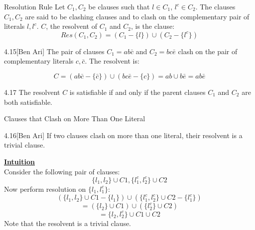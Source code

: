 \documentclass[style=sailor,size=12pt]{powerdot}
\begin{document}
\begin{wideslide}[bm=,toc=]{Resolution Rule}
Let $C_1, C_2$ be clauses such that $l \in C_1$, $l^c \in C_2$. The clauses
$C_1,C_2$ are said to be clashing clauses and to clash on the complementary
pair of literals $l,l^c$. $C$, the resolvent of $C_1$ and $C_2$, is the
clause:\\
\[ 
  Res(C_1,C_2) = (C_1 - \{l\}) \cup (C_2 - \{l^c\})
\]
\begin{ex}{4.15}[Ben Ari]
The pair of clauses $C_1 = ab\bar{c}$ and $C_2 = bc\bar{e}$ clash on the pair
of complementary literals $c, \bar{c}$. The resolvent is:

\[ 
  C = (ab\bar{c} - \{\bar{c}\}) \cup (bc\bar{e} - \{c\}) = ab\cup b\bar{e} = ab\bar{e}
  \]

\end{ex}
\begin{thm}{4.17}
The resolvent $C$ is satisfiable if and only if the parent clauses $C_1$ and
$C_2$ are both satisfiable.
\end{thm}

\end{wideslide}

\begin{wideslide}[bm=,toc=]{Clauses that Clash on More Than One Literal}
\begin{lem}{4.16}[Ben Ari]
If two clauses clash on more than one literal, their resolvent is a trivial
clause.
\end{lem}
{ \bf \underline{Intuition}}\\
Consider the following pair of clauses:
\[
  \{l_1, l_2\} \cup C1,  \{l_1^c, l_2^c\} \cup C2
  \]
Now perform resolution on $\{l_1, l_1^c\}$: 
\[
  (\{l_1, l_2\} \cup C1 - \{l_1\})\cup (\{l_1^c, l_2^c\} \cup C2 - \{l_1^c \})
\]
\[
  = (\{l_2\} \cup C1) \cup (\{l_2^c\} \cup C2)
\]
\[
  = \{l_2, l_2^c\} \cup C1 \cup C2
\]
Note that the resolvent is a trivial clause.
\end{wideslide}
\end{document}
